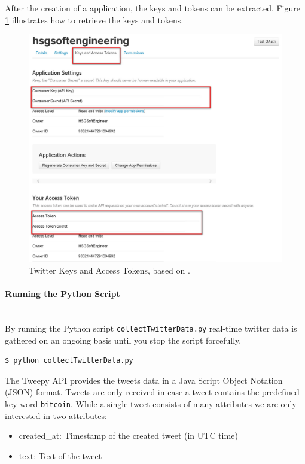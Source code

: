 \documentclass[a4paper,12pt]{article}
\begin{document}
\begin{spacing}{1.2}
After the creation of a application, the keys and tokens can be extracted. Figure \ref{figkeysandtokens} illustrates how to retrieve the keys and tokens.\\
\begin{figure}[H]
\centering
\includegraphics[scale=0.6]{twitteraccess}
\caption{Twitter Keys and Access Tokens, based on \textcite{twitterinc2017c}.}
\label{figkeysandtokens}
\end{figure}

\paragraph{Running the Python Script}\mbox{}\\{}
By running the Python script \verb|collectTwitterData.py| real-time twitter data is gathered on an ongoing basis until you stop the script forcefully.
\begin{lstlisting}[language=bash]
    $ python collectTwitterData.py
    \end{lstlisting}

The Tweepy API provides the tweets data in a Java Script Object Notation (JSON) format. Tweets are only received in case a tweet contains the predefined key word \verb|bitcoin|. While a single tweet consists of many attributes we are only interested in two attributes:
\begin{itemize}
    \item created\_at: Timestamp of the created tweet (in UTC time)
    \item text: Text of the tweet
\end{itemize}


\end{spacing}
\end{document}

